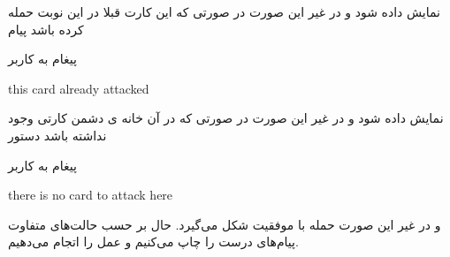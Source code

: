 \documentclass[]{article}
\begin{document}
نمایش داده شود و در غیر این صورت در صورتی که این کارت قبلا در این نوبت حمله 
کرده باشد پیام
\begin{mybox}[colback=yellow]{پیغام به کاربر}
	\begin{latin}	
		this card already attacked
	\end{latin}
\end{mybox}
نمایش داده شود و در غیر این صورت در صورتی که در آن خانه ی دشمن کارتی وجود 
نداشته باشد دستور
\begin{mybox}[colback=yellow]{پیغام به کاربر}
	\begin{latin}	
		there is no card to attack here	
	\end{latin}
\end{mybox}
و در غیر این صورت حمله با موفقیت شکل می‌گیرد. حال بر حسب حالت‌های متفاوت 
پیام‌های درست را چاپ می‌کنیم و عمل  را اتجام می‌دهیم.
\end{document}
